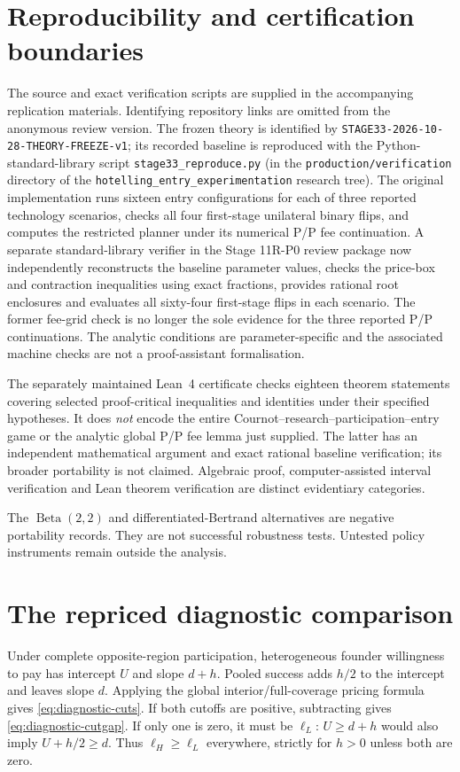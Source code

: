 \section{Reproducibility and certification boundaries}\label{app:repro}
The source and exact verification scripts are supplied in the accompanying replication materials.
Identifying repository links are omitted from the anonymous review version.
The frozen theory is identified by \texttt{STAGE33-2026-10-28-THEORY-FREEZE-v1};
its recorded baseline is reproduced with the Python-standard-library script \texttt{stage33\_reproduce.py}
(in the \texttt{production/verification} directory of the
\texttt{hotelling\_entry\_experimentation} research tree).
The original implementation runs sixteen entry configurations for each of three reported technology scenarios, checks all four first-stage unilateral binary flips, and computes the restricted planner under its numerical P/P fee continuation. A separate standard-library verifier in the Stage 11R-P0 review package now independently reconstructs the baseline parameter values, checks the price-box and contraction inequalities using exact fractions, provides rational root enclosures and evaluates all sixty-four first-stage flips in each scenario. The former fee-grid check is no longer the sole evidence for the three reported P/P continuations. The analytic conditions are parameter-specific and the associated machine checks are not a proof-assistant formalisation.

The separately maintained Lean~4 certificate checks eighteen theorem statements covering selected proof-critical inequalities and identities under their specified hypotheses. It does \emph{not} encode the entire Cournot--research--participation--entry game or the analytic global P/P fee lemma just supplied. The latter has an independent mathematical argument and exact rational baseline verification; its broader portability is not claimed. Algebraic proof, computer-assisted interval verification and Lean theorem verification are distinct evidentiary categories.

The $\operatorname{Beta}(2,2)$ and differentiated-Bertrand alternatives are negative portability records.
They are not successful robustness tests.
Untested policy instruments remain outside the analysis.

\clearpage
\section{The repriced diagnostic comparison}\label{app:diagnostic-proof}
Under complete opposite-region participation, heterogeneous founder willingness to pay has intercept $U$ and slope $d+h$.
Pooled success adds $h/2$ to the intercept and leaves slope $d$.
Applying the global interior/full-coverage pricing formula gives \eqref{eq:diagnostic-cuts}.
If both cutoffs are positive, subtracting gives \eqref{eq:diagnostic-cutgap}.
If only one is zero, it must be $\ell_L$: $U\geq d+h$ would also imply $U+h/2\geq d$.
Thus $\ell_H\geq\ell_L$ everywhere, strictly for $h>0$ unless both are zero.

